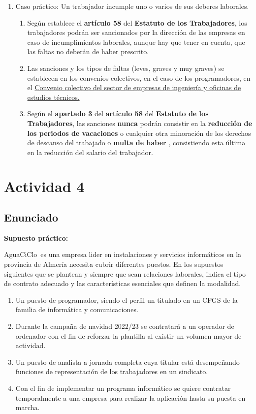 \begin{enumerate}
    \item Caso práctico: Un trabajador incumple uno o varios de sus deberes laborales.
    \begin{enumerate}
        \item Según establece el \textbf{artículo 58} del \textbf{Estatuto de los Trabajadores}, los trabajadores podrán ser sancionados por la dirección de las empresas en caso de incumplimientos laborales, aunque hay que tener en cuenta, que las faltas no deberán de haber prescrito.

        \item Las sanciones y los tipos de faltas (leves, graves y muy graves) se establecen en los convenios colectivos, en el caso de los programadores, en el \href{https://www.boe.es/diario_boe/txt.php?id=BOE-A-2019-14977}{ Convenio colectivo del sector de empresas de ingeniería y oficinas de estudios técnicos.}

        \item Según el \textbf{apartado 3} del \textbf{artículo 58} del \textbf{Estatuto de los Trabajadores}, las sanciones \textbf{nunca} podrán consistir en la \textbf{reducción de los periodos de vacaciones} o cualquier otra minoración de los derechos de descanso del trabajado o \textbf{multa de haber} \cite{rd2015}, consistiendo esta última en la reducción del salario del trabajador.
    \end{enumerate}
\end{enumerate}


\section{Actividad 4}

\subsection{Enunciado}
\textbf{Supuesto práctico:}

AguaCiClo es una empresa lider en instalaciones y servicios informáticos en la provincia de Almería necesita cubrir diferentes puestos. En los supuestos siguientes que se plantean y siempre que sean relaciones laborales, indica el tipo de contrato adecuado y las características esenciales que definen la modalidad.

\begin{enumerate}[label=(\alph*)]
    \item Un puesto de programador, siendo el perfil un titulado en un CFGS de la familia de informática y comunicaciones.
    \item Durante la campaña de navidad 2022/23 se contratará a un operador de ordenador con el fin de reforzar la plantilla al existir un volumen mayor de actividad.
    \item Un puesto de analista a jornada completa cuya titular está desempeñando funciones de representación de los trabajadores en un sindicato.
    \item Con el fin de implementar un programa informático se quiere contratar temporalmente a una empresa para realizar la aplicación hasta su puesta en marcha.
\end{enumerate}

